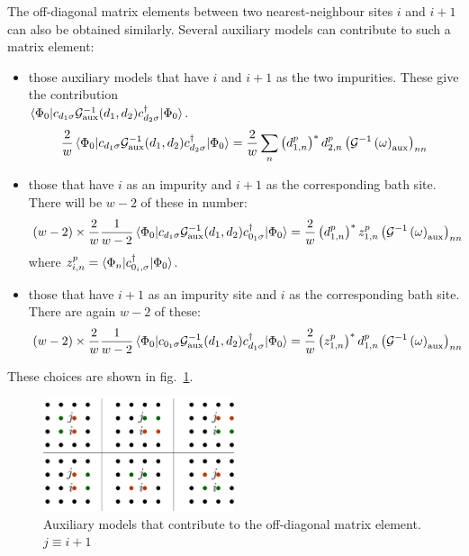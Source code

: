 \documentclass[10pt]{report}
\numberwithin{equation}{section}
\begin{document}
The off-diagonal matrix elements between two nearest-neighbour sites \(i\) and \(i+1\) can also be obtained similarly. Several  auxiliary models can contribute to such a matrix element:
\begin{itemize}
	\item those auxiliary models that have \(i\) and \(i+1\) as the two impurities. These give the contribution \\
		\(\braket{\Phi_0 | c_{d_1\sigma} \mathcal{G}^{-1}_\text{aux}(d_1,d_2) c^\dagger_{d_2\sigma} | \Phi_0}\). 
	\begin{equation}\begin{aligned}
		\frac{2}{w}\braket{\Phi_0 | c_{d_1\sigma} \mathcal{G}^{-1}_\text{aux}(d_1,d_2) c^\dagger_{d_2\sigma} | \Phi_0} = \frac{2}{w}\sum_{n} \left(d^p_{1,n}\right)^*d^p_{2,n} \left(\mathcal{G}^{-1}\left(\omega\right) _\text{aux}\right)_{nn}
	\end{aligned}\end{equation}
	\item those that have \(i\) as an impurity and \(i+1\) as the corresponding bath site. There will be \(w-2\) of these in number:
	\begin{equation}
		(w-2) \times \frac{2}{w}\frac{1}{w-2}\braket{\Phi_0 | c_{d_1\sigma} \mathcal{G}^{-1}_\text{aux}(d_1,d_2) c^\dagger_{0_1\sigma} | \Phi_0} = \frac{2}{w}\left(d^p_{1,n}\right)^* z^p_{1,n} \left(\mathcal{G}^{-1}\left(\omega\right) _\text{aux}\right)_{nn}
	\end{equation}
		where \(z^p_{i,n} = \braket{\Phi_n | c^\dagger_{0_i,\sigma} | \Phi_0}\).
	\item those that have \(i+1\) as an impurity site and \(i\) as the corresponding bath site. There are again \(w-2\) of these:
	\begin{equation}
		(w-2) \times \frac{2}{w}\frac{1}{w-2}\braket{\Phi_0 | c_{0_1\sigma} \mathcal{G}^{-1}_\text{aux}(d_1,d_2) c^\dagger_{d_1\sigma} | \Phi_0} = \frac{2}{w}\left(z^p_{1,n}\right)^* d^p_{1,n} \left(\mathcal{G}^{-1}\left(\omega\right) _\text{aux}\right)_{nn}
	\end{equation}
\end{itemize}
These choices are shown in fig.~\ref{off-diag-contrib}.
\begin{figure}[htpb]
	\centering
	\includegraphics[width=0.5\textwidth]{../figures/offdiagonal_contributors.pdf}
	\caption{Auxiliary models that contribute to the off-diagonal matrix element. \(j \equiv i+1\)}
	\label{off-diag-contrib}
\end{figure}
\end{document}
